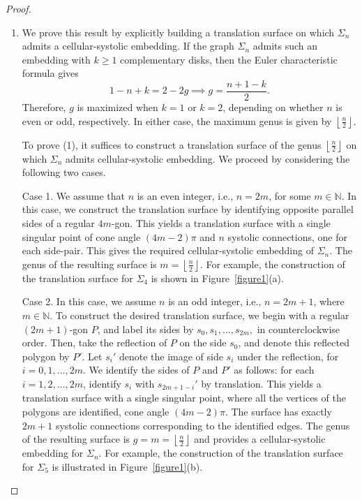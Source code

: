 \documentclass[11pt]{amsart}
\theoremstyle{plain}
\theoremstyle{definition}
\theoremstyle{remark}
\numberwithin{equation}{section}
\numberwithin{figure}{section}
\begin{document}
\begin{proof}
\begin{enumerate}
\item We prove this result by explicitly building a translation surface on which $\Sigma_n$ admits a cellular-systolic embedding. If the graph $\Sigma_n$ admits such an embedding with $k\geq 1$ complementary disks, then the Euler characteristic formula gives $$ 1 - n + k = 2 - 2g \implies g = \frac{n + 1 - k}{2}.$$ Therefore, $g$ is maximized when $k = 1$ or $k = 2$, depending on whether $n$ is even or odd, respectively. In either case, the maximum genus is given by $\left\lfloor \frac{n}{2} \right\rfloor$.

To prove (1), it suffices to construct a translation surface of the genus $\left\lfloor \frac{n}{2} \right\rfloor$ on which $\Sigma_n$ admits cellular-systolic embedding. We proceed by considering the following two cases.

Case 1. We assume that $n$ is an even integer, i.e., $n = 2m$, for some $m \in \mathbb{N}$. In this case, we construct the translation surface by identifying opposite parallel sides of a regular $4m$-gon. This yields a translation surface with a single singular point of cone angle $(4m - 2)\pi$ and $n$ systolic connections, one for each side-pair. This gives the required cellular-systolic embedding of $\Sigma_n$. The genus of the resulting surface is $m = \left\lfloor \frac{n}{2} \right\rfloor$. For example, the construction of the translation surface for $\Sigma_4$ is shown in Figure~\ref{figure1}(a).

Case 2. In this case, we assume $n$ is an odd integer, i.e., $n = 2m + 1$, where $m \in \mathbb{N}$. To construct the desired translation surface, we begin with a regular $(2m+1)$-gon $P$, and label its sides by $s_0, s_1, \dots, s_{2m},$ in counterclockwise order. Then, take the reflection of $P$ on the side $s_0$, and denote this reflected polygon by $P'$. Let $s_i'$ denote the image of side $s_i$ under the reflection, for $i = 0, 1, \dots, 2m$.
We identify the sides of $P$ and $P'$ as follows: for each $i = 1, 2, \dots, 2m$, identify $s_i$ with $s_{2m+1 - i}'$ by translation. This yields a translation surface with a single singular point, where all the vertices of the polygons are identified, cone angle $(4m - 2)\pi$. The surface has exactly $2m+1$ systolic connections corresponding to the identified edges. The genus of the resulting surface is $g = m=\left\lfloor \frac{n}{2} \right\rfloor$ and provides a cellular-systolic embedding for $\Sigma_n$. For example, the construction of the translation surface for $\Sigma_5$ is illustrated in Figure~\ref{figure1}(b).




\end{enumerate}
\end{proof}
\end{document}
